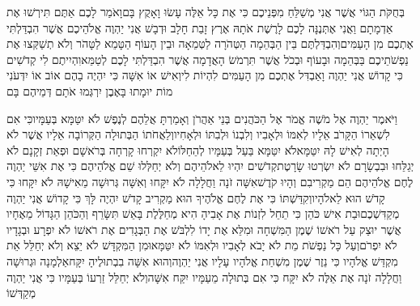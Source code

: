 \documentclass[../main/main.tex]{subfiles}
\begin{document}
\begin{multicols*}{\ncols}
בְּחֻקֹּת הַגּוֹי אֲשֶׁר אֲנִי מְשַׁלֵּחַ מִפְּנֵיכֶם כִּי אֶת כָּל אֵלֶּה עָשׂוּ וָאָקֻץ בָּם\PreVerseSpace{}וָאֹמַר לָכֶם אַתֶּם תִּירְשׁוּ אֶת אַדְמָתָם וַאֲנִי אֶתְּנֶנָּה לָכֶם לָרֶשֶׁת אֹתָהּ אֶרֶץ זָבַת חָלָב וּדְבָשׁ אֲנִי יַהְוֶה אֱלֹהֵיכֶם אֲשֶׁר הִבְדַּלְתִּי אֶתְכֶם מִן הָעַמִּים\PreVerseSpace{}וְהִבְדַּלְתֶּם בֵּין הַבְּהֵמָה הַטְּהֹרָה לַטְּמֵאָה וּבֵין הָעוֹף הַטָּמֵא לַטָּהֹר וְלֹא תְשַׁקְּצוּ אֶת נַפְשֹׁתֵיכֶם בַּבְּהֵמָה וּבָעוֹף וּבְכֹל אֲשֶׁר תִּרְמֹשׂ הָאֲדָמָה אֲשֶׁר הִבְדַּלְתִּי לָכֶם לְטַמֵּא\PreVerseSpace{}וִהְיִיתֶם לִי קְדֹשִׁים כִּי קָדוֹשׁ אֲנִי יַהְוֶה וָאַבְדִּל אֶתְכֶם מִן הָעַמִּים לִהְיוֹת לִי\PreVerseSpace{}וְאִישׁ אוֹ אִשָּׁה כִּי יִהְיֶה בָהֶם אוֹב אוֹ יִדְּעֹנִי מוֹת יוּמָתוּ בָּאֶבֶן יִרְגְּמוּ אֹתָם דְּמֵיהֶם בָּם\OpenSection{}\par
{}וַיֹּאמֶר יַהְוֶה אֶל מֹשֶׁה אֱמֹר אֶל הַכֹּהֲנִים בְּנֵי אַהֲרֹן וְאָמַרְתָּ אֲלֵהֶם לְנֶפֶשׁ לֹא יִטַּמָּא בְּעַמָּיו\PreVerseSpace{}כִּי אִם לִשְׁאֵרוֹ הַקָּרֹב אֵלָיו לְאִמּוֹ וּלְאָבִיו וְלִבְנוֹ וּלְבִתּוֹ וּלְאָחִיו\PreVerseSpace{}וְלַאֲחֹתוֹ הַבְּתוּלָה הַקְּרוֹבָה אֵלָיו אֲשֶׁר לֹא הָיְתָה לְאִישׁ לָהּ יִטַּמָּא\PreVerseSpace{}לֹא יִטַּמָּא בַּעַל בְּעַמָּיו לְהֵחַלּוֹ\PreVerseSpace{}לֹא יִקְרְחוּ\SubEnd{} קָרְחָה בְּרֹאשָׁם וּפְאַת זְקָנָם לֹא יְגַלֵּחוּ וּבִבְשָׂרָם לֹא יִשְׂרְטוּ שָׂרָטֶת\PreVerseSpace{}קְדֹשִׁים יִהְיוּ לֵאלֹהֵיהֶם וְלֹא יְחַלְּלוּ שֵׁם אֱלֹהֵיהֶם כִּי אֶת אִשֵּׁי יַהְוֶה לֶחֶם אֱלֹהֵיהֶם הֵם מַקְרִיבִם וְהָיוּ קֹדֶשׁ\PreVerseSpace{}אִשָּׁה זֹנָה וַחֲלָלָה לֹא יִקָּחוּ וְאִשָּׁה גְּרוּשָׁה מֵאִישָׁהּ לֹא יִקָּחוּ כִּי קָדֹשׁ הוּא לֵאלֹהָיו\PreVerseSpace{}וְקִדַּשְׁתּוֹ כִּי אֶת לֶחֶם אֱלֹהֶיךָ הוּא מַקְרִיב קָדֹשׁ יִהְיֶה לָּךְ כִּי קָדוֹשׁ אֲנִי יַהְוֶה מְקַדִּשְׁכֶם\PreVerseSpace{}וּבַת אִישׁ כֹּהֵן כִּי תֵחֵל לִזְנוֹת אֶת אָבִיהָ הִיא מְחַלֶּלֶת בָּאֵשׁ תִּשָּׂרֵף \ClosedSection{}וְהַכֹּהֵן הַגָּדוֹל מֵאֶחָיו אֲשֶׁר יוּצַק עַל רֹאשׁוֹ שֶׁמֶן הַמִּשְׁחָה וּמִלֵּא אֶת יָדוֹ לִלְבֹּשׁ אֶת הַבְּגָדִים אֶת רֹאשׁוֹ לֹא יִפְרָע וּבְגָדָיו לֹא יִפְרֹם\PreVerseSpace{}וְעַל כָּל נַפְשֹׁת מֵת לֹא יָבֹא לְאָבִיו וּלְאִמּוֹ לֹא יִטַּמָּא\PreVerseSpace{}וּמִן הַמִּקְדָּשׁ לֹא יֵצֵא וְלֹא יְחַלֵּל אֵת מִקְדַּשׁ אֱלֹהָיו כִּי נֵזֶר שֶׁמֶן מִשְׁחַת אֱלֹהָיו עָלָיו אֲנִי יַהְוֶה\PreVerseSpace{}וְהוּא אִשָּׁה בִבְתוּלֶיהָ יִקָּח\PreVerseSpace{}אַלְמָנָה וּגְרוּשָׁה וַחֲלָלָה זֹנָה אֶת אֵלֶּה לֹא יִקָּח כִּי אִם בְּתוּלָה מֵעַמָּיו יִקַּח אִשָּׁה\PreVerseSpace{}וְלֹא יְחַלֵּל זַרְעוֹ בְּעַמָּיו כִּי אֲנִי יַהְוֶה מְקַדְּשׁוֹ\OpenSection{}\par

\end{multicols*}
\end{document}
